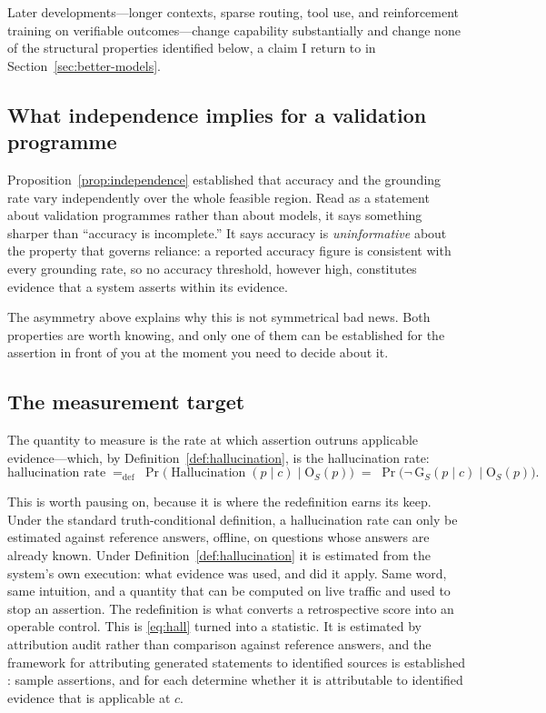 \documentclass[11pt]{article}
\newcommand{\Out}{\mathrm{O}}          %
\newcommand{\Grd}{\mathrm{G}}          %
\newcommand{\Hall}{\operatorname{Hallucination}}
\theoremstyle{plain}
\theoremstyle{definition}
\begin{document}
Later developments---longer contexts, sparse routing, tool use, and
reinforcement training on verifiable outcomes---change capability substantially and
change none of the structural properties identified below, a claim I return to in
Section~\ref{sec:better-models}.

\subsection{What independence implies for a validation programme}

Proposition~\ref{prop:independence} established that accuracy and the grounding
rate vary independently over the whole feasible region. Read as a statement about
validation programmes rather than about models, it says something sharper than
``accuracy is incomplete.'' It says accuracy is \emph{uninformative} about the
property that governs reliance: a reported accuracy figure is consistent with every
grounding rate, so no accuracy threshold, however high, constitutes evidence that a
system asserts within its evidence.

The asymmetry above explains why this is not symmetrical bad news. Both properties
are worth knowing, and only one of them can be established for the assertion in
front of you at the moment you need to decide about it.

\subsection{The measurement target}

The quantity to measure is the rate at which assertion outruns applicable
evidence---which, by Definition~\ref{def:hallucination}, is the hallucination rate:
\begin{equation}
  \text{hallucination rate}
  \;=_{\mathrm{def}}\;
  \Pr\bigl(\Hall(p \mid c) \;\big|\; \Out_S(p)\bigr)
  \;=\;
  \Pr\bigl(\neg\,\Grd_S(p \mid c) \;\big|\; \Out_S(p)\bigr).
  \label{eq:rate}
\end{equation}

This is worth pausing on, because it is where the redefinition earns its keep. Under
the standard truth-conditional definition, a hallucination rate can only be
estimated against reference answers, offline, on questions whose answers are already
known. Under Definition~\ref{def:hallucination} it is estimated from the system's own
execution: what evidence was used, and did it apply. Same word, same intuition, and a
quantity that can be computed on live traffic and used to stop an assertion. The
redefinition is what converts a retrospective score into an operable control.
This is \eqref{eq:hall} turned into a statistic. It is estimated by attribution
audit rather than comparison against reference answers, and the framework for attributing
generated statements to identified sources is established
\citep{rashkin2023}: sample assertions, and for each determine whether it is
attributable to identified evidence that is applicable at $c$.
\end{document}
